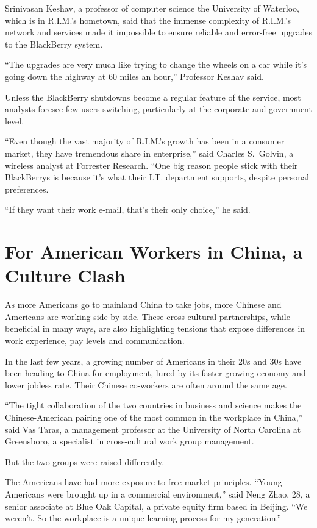 ﻿\documentclass[12pt]{article}
\begin{document}
Srinivasan Keshav, a professor of computer science the University of Waterloo, which is in R.I.M.'s
hometown, said that the immense complexity of R.I.M.'s network and services made it impossible to
ensure reliable and error-free upgrades to the BlackBerry system.

``The upgrades are very much like trying to change the wheels on a car while it's going down the
highway at 60 miles an hour,'' Professor Keshav said.

Unless the BlackBerry shutdowns become a regular feature of the service, most analysts foresee few
users switching, particularly at the corporate and government level.

``Even though the vast majority of R.I.M.'s growth has been in a consumer market, they have
tremendous share in enterprise,'' said Charles S.~Golvin, a wireless analyst at Forrester Research.
``One big reason people stick with their BlackBerrys is because it's what their I.T. department
supports, despite personal preferences.

``If they want their work e-mail, that's their only choice,'' he said.

\section{For American Workers in China, a Culture Clash}

\lettrine{A}{s} more Americans go to mainland China to take jobs, more
Chinese and Americans are working side by side. These cross-cultural partnerships, while beneficial
in many ways, are also highlighting tensions that expose differences in work experience, pay levels
and communication.

In the last few years, a growing number of Americans in their 20s and 30s have been heading to China
for employment, lured by its faster-growing economy and lower jobless rate. Their Chinese co-workers
are often around the same age.

``The tight collaboration of the two countries in business and science makes the Chinese-American
pairing one of the most common in the workplace in China,'' said Vas Taras, a management professor
at the University of North Carolina at Greensboro, a specialist in cross-cultural work group
management.

But the two groups were raised differently.

The Americans have had more exposure to free-market principles. ``Young Americans were brought up in
a commercial environment,'' said Neng Zhao, 28, a senior associate at Blue Oak Capital, a private
equity firm based in Beijing. ``We weren't. So the workplace is a unique learning process for my
generation.''
\end{document}
